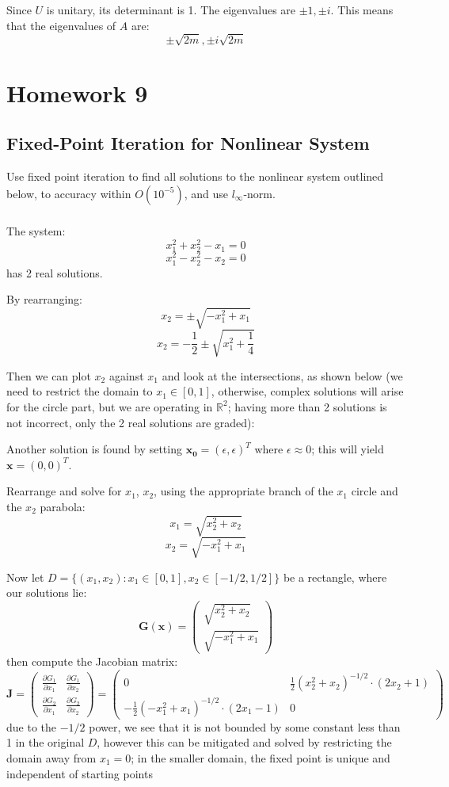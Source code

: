 \documentclass[12pt]{article} %
\newcommand{\rr}{\mathbb{R}}
\newcommand{\1}[1]{\mathds{1}\left[#1\right]}
\newcommand{\eps}{\epsilon}
\begin{document}
Since $U$ is unitary, its determinant is 1. The eigenvalues are $\pm 1, \pm i$. This means that the eigenvalues of $A$ are:
$$
	\pm \sqrt{2m}, \pm i\sqrt{2m}
$$

\section{Homework 9}
\subsection{Fixed-Point Iteration for Nonlinear System}
Use fixed point iteration to find all solutions to the nonlinear system outlined below, to accuracy within $O(10^{-5})$, and use $l_{\infty}$-norm.
\subsubsection{}
The system:
$$
	x_1^2 + x_2^2 - x_1 = 0
$$
$$
	x_1^2 - x_2^2 - x_2 = 0
$$ has 2 real solutions.

By rearranging:
$$
	x_2 = \pm\sqrt{-x_1^2+x_1}
$$
$$
	x_2 = -\frac12\pm \sqrt{x_1^2 + \frac14}
$$

Then we can plot $x_2$ against $x_1$ and look at the intersections, as shown below (we need to restrict the domain to $x_1\in [0,1]$, otherwise, complex solutions will arise for the circle part, but we are operating in $\rr^2$; having more than 2 solutions is not incorrect, only the 2 real solutions are graded):


Another solution is found by setting $\mathbf{x_0} = (\eps, \eps)^T$ where $\eps \approx 0$; this will yield $\mathbf{x} = (0,0)^T$.

Rearrange and solve for $x_1$, $x_2$, using the appropriate branch of the $x_1$ circle and the $x_2$ parabola:
$$
	x_1 = \sqrt{x_2^2+x_2}
$$
$$
	x_2 = \sqrt{-x_1^2 + x_1}
$$

Now let $D=\{(x_1, x_2): x_1\in[0,1],x_2\in[-1/2, 1/2]\}$ be a rectangle, where our solutions lie:
$$
	\mathbf{G}(\mathbf{x}) = 
	\begin{pmatrix}
		\sqrt{x_2^2+x_2} \\
		\sqrt{-x_1^2 + x_1}
	\end{pmatrix}
$$ then compute the Jacobian matrix:
$$
	\mathbf{J} = 
	\begin{pmatrix}
		\frac{\partial G_1}{\partial x_1} & \frac{\partial G_1}{\partial x_2}\\
		\frac{\partial G_2}{\partial x_1} & \frac{\partial G_2}{\partial x_2}
	\end{pmatrix}
	=
	\begin{pmatrix}
	0 & \frac12(x_2^2+x_2)^{-1/2}\cdot(2x_2+1)\\
	-\frac12(-x_1^2+x_1)^{-1/2}\cdot (2x_1-1) & 0
	\end{pmatrix}
$$ due to the $-1/2$ power, we see that it is not bounded by some constant less than 1 in the original $D$, however this can be mitigated and solved by restricting the domain away from $x_1=0$; in the smaller domain, the fixed point is unique and independent of starting points 
\end{document}
